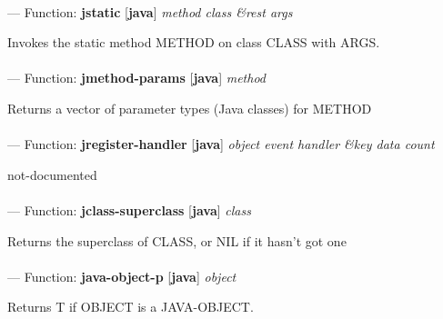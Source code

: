 \paragraph{}
\label{JAVA:JSTATIC}
--- Function: \textbf{jstatic} [\textbf{java}] \textit{method class \&rest args}

\begin{adjustwidth}{5em}{5em}
Invokes the static method METHOD on class CLASS with ARGS.
\end{adjustwidth}

\paragraph{}
\label{JAVA:JMETHOD-PARAMS}
--- Function: \textbf{jmethod-params} [\textbf{java}] \textit{method}

\begin{adjustwidth}{5em}{5em}
Returns a vector of parameter types (Java classes) for METHOD
\end{adjustwidth}

\paragraph{}
\label{JAVA:JREGISTER-HANDLER}
--- Function: \textbf{jregister-handler} [\textbf{java}] \textit{object event handler \&key data count}

\begin{adjustwidth}{5em}{5em}
not-documented
\end{adjustwidth}

\paragraph{}
\label{JAVA:JCLASS-SUPERCLASS}
--- Function: \textbf{jclass-superclass} [\textbf{java}] \textit{class}

\begin{adjustwidth}{5em}{5em}
Returns the superclass of CLASS, or NIL if it hasn't got one
\end{adjustwidth}

\paragraph{}
\label{JAVA:JAVA-OBJECT-P}
--- Function: \textbf{java-object-p} [\textbf{java}] \textit{object}

\begin{adjustwidth}{5em}{5em}
Returns T if OBJECT is a JAVA-OBJECT.
\end{adjustwidth}

